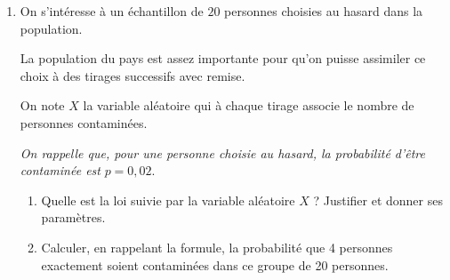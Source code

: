 \begin{enumerate}
\begin{enumerate}
		\item \og Plus de 98\,\% de la population vaccinée n'a pas été contaminée.\fg{}
	\end{enumerate}
\item On s'intéresse à un échantillon de $20$ personnes choisies au hasard dans la population.

La population du pays est assez importante pour qu'on puisse assimiler ce choix à des tirages successifs avec remise.

On note $X$ la variable aléatoire qui à chaque tirage associe le nombre de personnes contaminées.

\emph{On rappelle que, pour une personne choisie au hasard, la probabilité d'être contaminée est} $p = 0,02$.
	\begin{enumerate}
		\item Quelle est la loi suivie par la variable aléatoire $X$ ? Justifier et donner ses paramètres.
		\item Calculer, en rappelant la formule, la probabilité que 4 personnes exactement soient contaminées dans ce groupe de 20 personnes.
	\end{enumerate}
\end{enumerate}

\bigskip

